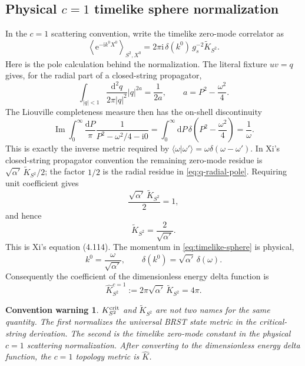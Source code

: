 \documentclass[11pt]{article}
\numberwithin{equation}{section}
\newcommand{\A}{\alpha'}
\newcommand{\dd}{\mathrm d}
\newcommand{\ee}{\mathrm e}
\newcommand{\ii}{\mathrm i}
\newcommand{\wh}{\widehat}
\newcommand{\wt}{\widetilde}
\newcommand{\vev}[1]{\left\langle #1\right\rangle}
\newtheorem{warning}{Convention warning}
\begin{document}
\subsection{Physical \texorpdfstring{$c=1$}{c=1} timelike sphere normalization}

In the $c=1$ scattering convention, write the timelike zero-mode correlator as
\begin{equation}
 \vev{\ee^{-\ii k^0X^0}}_{S^2,X^0}
 =2\pi\ii\,\delta(k^0)\,g_s^{-2}\wt K_{S^2}.
 \label{eq:timelike-sphere}
\end{equation}
Here is the pole calculation behind the normalization.  The literal fixture
$uv=q$ gives, for the radial part of a closed-string propagator,
\begin{equation}
 \int_{|q|<1}\frac{\dd^2q}{2\pi|q|^2}|q|^{2a}
 =\frac{1}{2a},
 \qquad a=P^2-\frac{\omega^2}{4}.
 \label{eq:q-radial-pole}
\end{equation}
The Liouville completeness measure then has the on-shell discontinuity
\begin{equation}
 \operatorname{Im}\int_0^\infty\frac{\dd P}{\pi}
 \frac{1}{P^2-\omega^2/4-\ii0}
 =\int_0^\infty\dd P\,
 \delta\!\left(P^2-\frac{\omega^2}{4}\right)
 =\frac1\omega.
 \label{eq:liouville-cut}
\end{equation}
This is exactly the inverse metric required by
$\langle\omega|\omega'\rangle=\omega\delta(\omega-\omega')$.  In Xi's
closed-string propagator convention the remaining zero-mode residue is
$\sqrt{\A}\,\wt K_{S^2}/2$; the factor $1/2$ is the radial residue in
\eqref{eq:q-radial-pole}.  Requiring unit coefficient gives
\begin{equation}
 \frac{\sqrt{\A}\,\wt K_{S^2}}{2}=1,
\end{equation}
and hence
\begin{equation}
 \boxed{\wt K_{S^2}=\frac{2}{\sqrt{\A}}.}
 \label{eq:Ktilde}
\end{equation}
This is Xi's equation (4.114).  The momentum in
\eqref{eq:timelike-sphere} is physical,
\begin{equation}
 k^0=\frac{\omega}{\sqrt{\A}},
 \qquad
 \delta(k^0)=\sqrt{\A}\,\delta(\omega).
 \label{eq:delta-jacobian}
\end{equation}
Consequently the coefficient of the dimensionless energy delta function is
\begin{equation}
 \boxed{
 \wh K_{S^2}^{c=1}
 :=2\pi\sqrt{\A}\,\wt K_{S^2}
 =4\pi.}
 \label{eq:Khat}
\end{equation}

\begin{warning}
$K_{S^2}^{\rm crit}$ and $\wt K_{S^2}$ are not two names for the same
quantity.  The first normalizes the universal BRST state metric in the
critical-string derivation.  The second is the timelike zero-mode constant in
the physical $c=1$ scattering normalization.  After converting to the
dimensionless energy delta function, the $c=1$ topology metric is $\wh K$.
\end{warning}
\end{document}
